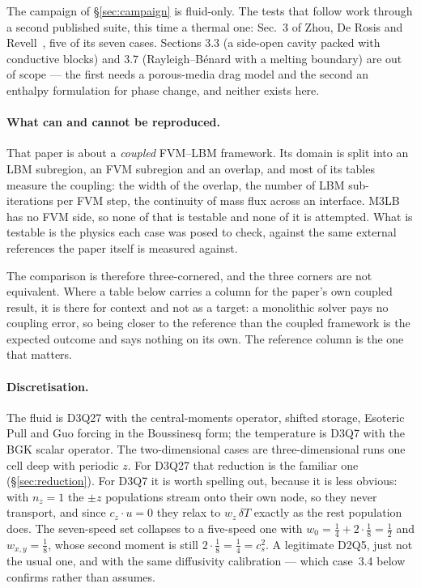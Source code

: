 \documentclass[11pt,a4paper]{article}
\begin{document}
The campaign of \S\ref{sec:campaign} is fluid-only. The tests that follow work
through a second published suite, this time a thermal one: Sec.~3 of Zhou, De
Rosis and Revell~\cite{zhou2026}, five of its seven cases. Sections 3.3 (a
side-open cavity packed with conductive blocks) and 3.7 (Rayleigh--B\'enard with
a melting boundary) are out of scope --- the first needs a porous-media drag
model and the second an enthalpy formulation for phase change, and neither
exists here.

\paragraph{What can and cannot be reproduced.} That paper is about a
\emph{coupled} FVM--LBM framework. Its domain is split into an LBM subregion, an
FVM subregion and an overlap, and most of its tables measure the coupling: the
width of the overlap, the number of LBM sub-iterations per FVM step, the
continuity of mass flux across an interface. M3LB has no FVM side, so none of
that is testable and none of it is attempted. What is testable is the physics
each case was posed to check, against the same external references the paper
itself is measured against.

The comparison is therefore three-cornered, and the three corners are not
equivalent. Where a table below carries a column for the paper's own coupled
result, it is there for context and not as a target: a monolithic solver pays no
coupling error, so being closer to the reference than the coupled framework is
the expected outcome and says nothing on its own. The reference column is the
one that matters.

\paragraph{Discretisation.} The fluid is D3Q27 with the central-moments
operator, shifted storage, Esoteric Pull and Guo forcing in the Boussinesq form;
the temperature is D3Q7 with the BGK scalar operator. The two-dimensional cases
are three-dimensional runs one cell deep with periodic $z$. For D3Q27 that
reduction is the familiar one (\S\ref{sec:reduction}). For D3Q7 it is worth
spelling out, because it is less obvious: with $n_z=1$ the $\pm z$ populations
stream onto their own node, so they never transport, and since $c_z\!\cdot\!u=0$
they relax to $w_z\,\delta T$ exactly as the rest population does. The
seven-speed set collapses to a five-speed one with
$w_0 = \tfrac14 + 2\cdot\tfrac18 = \tfrac12$ and $w_{x,y}=\tfrac18$, whose
second moment is still $2\cdot\tfrac18 = \tfrac14 = c_s^2$. A legitimate D2Q5,
just not the usual one, and with the same diffusivity calibration --- which
case~3.4 below confirms rather than assumes.
\end{document}

